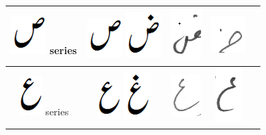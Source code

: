 \begin{table}[h]
\begin{tabular}{@{}ccccc@{}}
\includegraphics[scale=0.25]{Suad_orig} series & \includegraphics[scale=0.25]{Suad_orig} \includegraphics[scale=0.25]{zuad} & \includegraphics[scale=0.25]{15} &
\includegraphics[scale=0.25]{16} & \\ 
\hline
\includegraphics[scale=0.25]{Aien_orig} series & \includegraphics[scale=0.25]{Aien_orig} \includegraphics[scale=0.25]{ghen} & \includegraphics[scale=0.25]{17} &
\includegraphics[scale=0.20]{18} & \\ 

\end{tabular}
\end{table}
